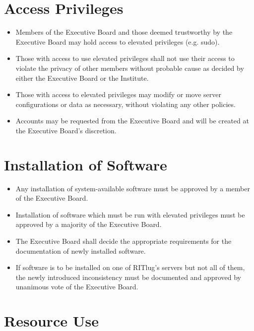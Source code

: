 



\section{Access Privileges}

\begin{itemize}
\item Members of the Executive Board and those deemed trustworthy by the Executive Board may hold access to elevated privileges (e.g. sudo).
\item Those with access to use elevated privileges shall not use their access to violate the privacy of other members without probable cause as decided by either the Executive Board or the Institute.
\item Those with access to elevated privileges may modify or move server configurations or data as necessary, without violating any other policies.
\item Accounts may be requested from the Executive Board and will be created at the Executive Board's discretion.
\end{itemize}

\section{Installation of Software}

\begin{itemize}
\item Any installation of system-available software must be approved by a member of the Executive Board.
\item Installation of software which must be run with elevated privileges must be approved by a majority of the Executive Board.
\item The Executive Board shall decide the appropriate requirements for the documentation of newly installed software.
\item If software is to be installed on one of RITlug's servers but not all of them, the newly introduced inconsistency must be documented and approved by unanimous vote of the Executive Board.
\end{itemize}

\section{Resource Use}


